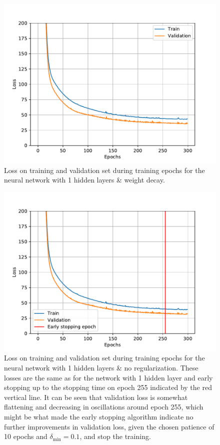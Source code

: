 \begin{figure}
    \centering
    \includegraphics{pics/figure_Boston_NN_1hidden_wd_loss.pdf}
    \caption{Loss on training and validation set during training epochs for the neural network with 1 hidden layers \& weight decay.}
    \label{fig:Boston_NN_1hidden_wd_loss}
\end{figure}


\begin{figure}
    \centering
    \includegraphics{pics/figure_Boston_NN_1hidden_noreg_loss.pdf}
    \caption{Loss on training and validation set during training epochs for the neural network with 1 hidden layers \& no regularization. These losses are the same as for the network with 1 hidden layer and early stopping up to the stopping time on epoch 255 indicated by the red vertical line. It can be seen that validation loss is somewhat flattening and decreasing in oscillations around epoch 255, which might be what made the early stopping algorithm indicate no further improvements in validation loss, given the chosen patience of 10 epochs and $\delta_{\text{min}} = 0.1$, and stop the training.}
    \label{fig:Boston_NN_1hidden_noreg_loss}
\end{figure}

